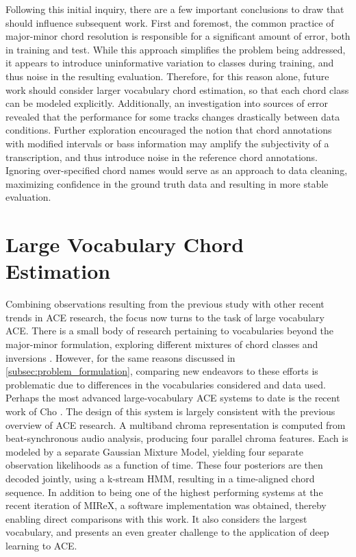 Following this initial inquiry, there are a few important conclusions to draw that should influence subsequent work.
First and foremost, the common practice of major-minor chord resolution is responsible for a significant amount of error, both in training and test.
While this approach simplifies the problem being addressed, it appears to introduce uninformative variation to classes during training, and thus noise in the resulting evaluation.
Therefore, for this reason alone, future work should consider larger vocabulary chord estimation, so that each chord class can be modeled explicitly.
Additionally, an investigation into sources of error revealed that the performance for some tracks changes drastically between data conditions.
Further exploration encouraged the notion that chord annotations with modified intervals or bass information may amplify the subjectivity of a transcription, and thus introduce noise in the reference chord annotations.
Ignoring over-specified chord names would serve as an approach to data cleaning, maximizing confidence in the ground truth data and resulting in more stable evaluation.


\section{Large Vocabulary Chord Estimation}
\label{subsec:large_vocabulary_ace}

Combining observations resulting from the previous study with other recent trends in ACE research, the focus now turns to the task of large vocabulary ACE.
There is a small body of research pertaining to vocabularies beyond the major-minor formulation, exploring different mixtures of chord classes and inversions \cite{Mauch2010Simultaneous, Ni2012End}.
However, for the same reasons discussed in \ref{subsec:problem_formulation}, comparing new endeavors to these efforts is problematic due to differences in the vocabularies considered and data used.
Perhaps the most advanced large-vocabulary ACE systems to date is the recent work of Cho \cite{Cho2014Improved}.
The design of this system is largely consistent with the previous overview of ACE research.
A multiband chroma representation is computed from beat-synchronous audio analysis, producing four parallel chroma features.
Each is modeled by a separate Gaussian Mixture Model, yielding four separate observation likelihoods as a function of time.
These four posteriors are then decoded jointly, using a k-stream HMM, resulting in a time-aligned chord sequence.
In addition to being one of the highest performing systems at the recent iteration of MIReX, a software implementation was obtained, thereby enabling direct comparisons with this work.
It also considers the largest vocabulary, and presents an even greater challenge to the application of deep learning to ACE.


